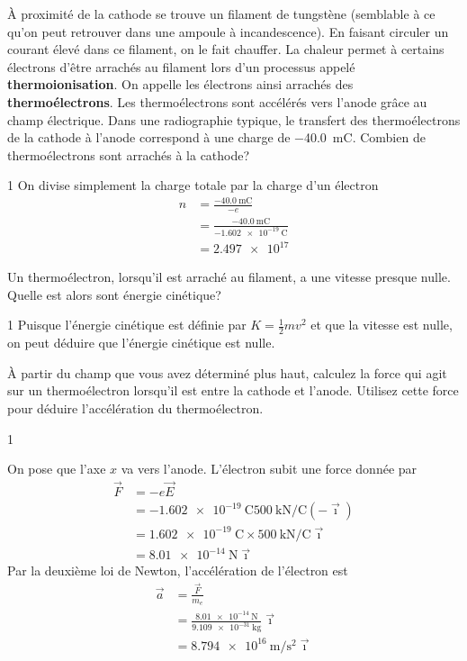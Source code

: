 \documentclass{tufte-handout}
\newcommand{\xhat}{\vec{\imath}}
\newcommand{\va}{\vec{a}}
\newcommand{\vF}{\vec{F}}
\newcommand{\vE}{\vec{E}}
\def\reponse{0}
\begin{document}
À proximité de la cathode se trouve un filament de tungstène (semblable à ce
qu'on peut retrouver dans une ampoule à incandescence). En faisant circuler un
courant élevé dans ce filament, on le fait chauffer.  La chaleur permet à
certains électrons d'être arrachés au filament lors d'un processus appelé
\textbf{thermoionisation}. On appelle les électrons ainsi arrachés des
\textbf{thermoélectrons}. Les thermoélectrons sont accélérés vers l'anode grâce
au champ électrique. Dans une radiographie typique, le transfert des
thermoélectrons de la cathode à l'anode correspond à une charge de
\SI{-40.0}{\milli\coulomb}. Combien de thermoélectrons sont arrachés à la
cathode?

\if\reponse1
  {\color{tblue}
    On divise simplement la charge totale par la charge d'un électron
    \begin{align*}
      n &= \frac{\SI{-40.0}{\milli\coulomb}}{-e}  \\
        &= \frac{\SI{-40.0}{\milli\coulomb}}{\SI{-1.602e-19}{\coulomb}}  \\
        &= \num{2.497e17}
    \end{align*}
  }
\else
  \vspace{5cm}
\fi

Un thermoélectron, lorsqu'il est arraché au filament, a une vitesse presque
nulle. Quelle est alors sont énergie cinétique?

\if\reponse1
  {\color{tblue}
    Puisque l'énergie cinétique est définie par $K = \frac{1}{2} mv^2$
    et que la vitesse est nulle, on peut déduire que l'énergie cinétique est
    nulle.
  }
\else
  \vspace{3cm}
\fi

À partir du champ que vous avez déterminé plus haut, calculez la force qui agit
sur un thermoélectron lorsqu'il est entre la cathode et l'anode. Utilisez cette
force pour déduire l'accélération du thermoélectron.

\if\reponse1
  {\color{tblue}
    On pose que l'axe $x$ va vers l'anode. L'électron subit une force donnée par
    \begin{align*}
      \vF &= -e \vE  \\
          &= \SI{-1.602e-19}{\coulomb} \SI{500}{\kilo\newton\per\coulomb} (-\xhat)  \\
          &= \SI{1.602e-19}{\coulomb} \times \SI{500}{\kilo\newton\per\coulomb} \xhat  \\
          &= \SI{8.01e-14}{\newton} \xhat
    \end{align*}
    Par la deuxième loi de Newton, l'accélération de l'électron est
    \begin{align*}
      \va &= \frac{\vF}{m_e}  \\
          &= \frac{\SI{8.01e-14}{\newton}}{\SI{9.109e-31}{\kilo\gram}} \xhat  \\
          &= \SI{8.794e16}{\meter\per\second\squared} \xhat
    \end{align*}

  }
\else
  \vspace{10cm}
\fi
\end{document}
